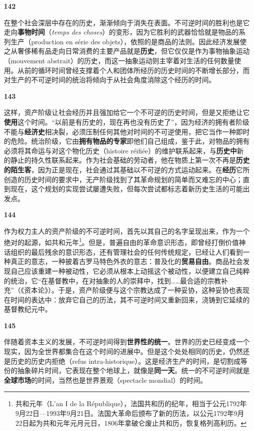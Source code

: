 \documentclass[fontset=fandol, a4paper, 12pt, openright]{ctexbook}
\makeatletter
\newcommand{\thesis}[1]{%
    \par\vspace{1.5em}%
    {\centering \textbf{\Large #1}\par}%
    \nobreak\vspace{0.5em}\nobreak
    \@afterindenttrue %
    \@afterheading    %
}
\makeatother
\begin{document}
\thesis{142}
在整个社会深层中存在的历史，渐渐倾向于消失在表面。不可逆时间的胜利也是它走向\textbf{事物时间}（\textit{temps des choses}）的变形，因为它胜利的武器恰恰就是物品的系列生产（production en série des objets），依照的是商品的法则。因此经济发展使之从奢侈稀有品走向日常消费的主要产品就是\textbf{历史}，但它仅仅是作为事物抽象运动（mouvement abstrait）的历史，而这一抽象运动则主宰着对生活的任何数量使用。从前的循环时间曾经支撑着个人和团体所经历的历史时间的不断增长部分，而对生产的不可逆时间的统治将倾向于从社会角度消除这个经历的时间。

\thesis{143}
这样，资产阶级让社会经历并且强加给它一个不可逆的历史时间，但是又拒绝让它\textbf{使用}这个时间。“以前是有历史的，现在再也没有历史了”，因为经济的拥有者阶级不能与\textbf{经济史}相决裂，必须压制任何其他对时间的不可逆使用，把它当作一种即时的危险。统治阶级，它由\textbf{拥有物品的专家}即他们自己组成，鉴于此，对物品的拥有必须将其命运与对这个物化历史（histoire réifiée）的维护联系起来，与\textbf{历史中}新的静止的持久性联系起来。作为社会基础的劳动者，他在物质上第一次不再是\textbf{历史的陌生客}，因为正是现在，社会通过其基础以不可逆的方式运动起来。在\textbf{经历}它所创造的历史时间的要求中，无产阶级找到了其革命规划的简单而又难忘的中心；直到现在，这个规划的实现尝试屡遭失败，但每次尝试都标志着新历史生活的可能出发点。

\thesis{144}
作为权力主人的资产阶级的不可逆时间，首先以其自己的名字呈现出来，作为一个绝对的起源，如共和元年\footnote{共和元年（L'an I de la République），法国共和历的纪年，相当于公元1792年9月22日—1993年9月21日。法国大革命后颁布了新的历法，以公元1792年9月22日起为共和元年元月元日，1806年拿破仑废止共和历，恢复格列高利历。}。但是，普遍自由的革命意识形态，即曾经打倒价值神话组织的最后残余的意识形态，还有管理社会的任何传统规定，已经让人们看到一种真正的意志，一种披着古罗马特色外衣的意志：普及化的\textbf{贸易自由}。商品社会发现自己应该重建一种被动性，它必须从根本上动摇这个被动性，以便建立自己纯粹的统治，它“在基督教中，在对抽象的人的崇拜中，找到……最合适的宗教补充”（《资本论》）。于是，资产阶级便与这个宗教达成了一种妥协，这种妥协也表现在时间的表达中：放弃它自己的历法，其不可逆时间又重新回来，浇铸到它延续的基督教纪元中。

\thesis{145}
伴随着资本主义的发展，不可逆时间得到\textbf{世界性的统一}。世界的历史已经变成一个现实，因为全世界都集合在这个时间的进展中。但是这个处处相同的历史，仍然还是历史的历史内拒绝（refus intra-historique）。这是经济生产的时间，是切割成等份的抽象碎片时间，它表现在整个地球上，就像是\textbf{同一天}。统一的不可逆时间就是\textbf{全球市场}的时间，当然也是世界景观（spectacle mondial）的时间。
\end{document}
